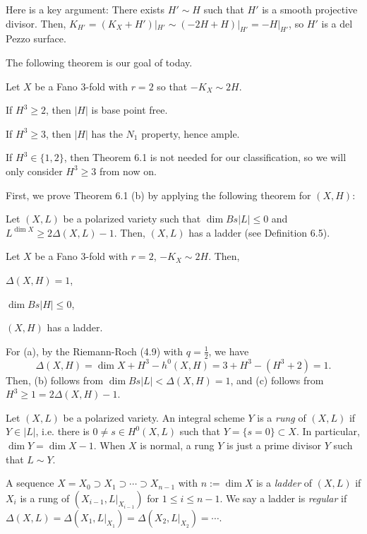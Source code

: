 \documentclass{../../small}
\begin{document}
Here is a key argument:
There exists $H'\sim H$ such that $H'$ is a smooth projective divisor.
Then, $K_{H'}=(K_X+H')|_{H'}\sim(-2H+H)|_{H'}=-H|_{H'}$, so $H'$ is a del Pezzo surface.

The following theorem is our goal of today.
\begin{thm}
Let $X$ be a Fano 3-fold with $r=2$ so that $-K_X\sim 2H$.
\begin{parts}
\item If $H^3\ge2$, then $|H|$ is base point free.
\item If $H^3\ge3$, then $|H|$ has the $N_1$ property, hence ample.
\end{parts}
\end{thm}

\begin{rmk}
If $H^3\in\{1,2\}$, then Theorem 6.1 is not needed for our classification, so we will only consider $H^3\ge3$ from now on.
\end{rmk}

First, we prove Theorem 6.1 (b) by applying the following theorem for $(X,H)$:
\begin{thm}
Let $(X,L)$ be a polarized variety such that $\dim Bs|L|\le0$ and $L^{\dim X}\ge2\Delta(X,L)-1$.
Then, $(X,L)$ has a ladder (see Definition 6.5). 
\end{thm}

\begin{prop}
Let $X$ be a Fano 3-fold with $r=2$, $-K_X\sim2H$.
Then,
\begin{parts}
\item $\Delta(X,H)=1$,
\item $\dim Bs|H|\le0$,
\item $(X,H)$ has a ladder.
\end{parts}
\end{prop}
\begin{pf}
For (a), by the Riemann-Roch (4.9) with $q=\frac12$, we have
\[\Delta(X,H)=\dim X+H^3-h^0(X,H)=3+H^3-(H^3+2)=1.\]
Then, (b) follows from $\dim Bs|L|<\Delta(X,H)=1$, and (c) follows from $H^3\ge1=2\Delta(X,H)-1$.
\end{pf}

\begin{defn}
Let $(X,L)$ be a polarized variety.
An integral scheme $Y$ is a \emph{rung} of $(X,L)$ if $Y\in|L|$, i.e. there is $0\ne s\in H^0(X,L)$ such that $Y=\{s=0\}\subset X$.
In particular, $\dim Y=\dim X-1$.
When $X$ is normal, a rung $Y$ is just a prime divisor $Y$ such that $L\sim Y$.

A sequence $X=X_0\supset X_1\supset\cdots\supset X_{n-1}$ with $n:=\dim X$ is a \emph{ladder} of $(X,L)$ if $X_i$ is a rung of $(X_{i-1},L|_{X_{i-1}})$ for $1\le i\le n-1$.
We say a ladder is \emph{regular} if $\Delta(X,L)=\Delta(X_1,L|_{X_1})=\Delta(X_2,L|_{X_2})=\cdots$.
\end{defn}
\end{document}
